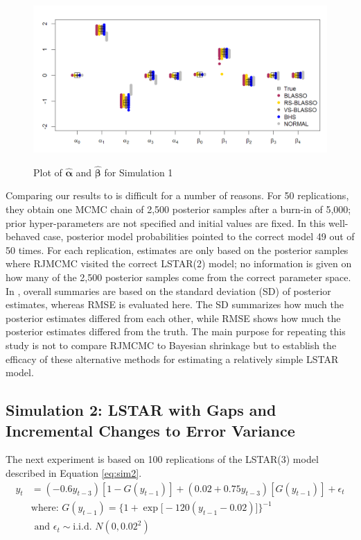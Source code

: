 \begin{figure}[!h]
	\centering
	      \caption{Plot of $\hat{\bm{\alpha}}$ and $\hat{\bm{\beta}}$ for Simulation 1 }
      \includegraphics[scale=0.35]{blassovsbhs}
      \label{fig:blvsbh}
\end{figure}

Comparing our results to \cite{Lopes2006} is difficult for a number of reasons. For 50 replications, they obtain one MCMC chain of 2,500 posterior samples after a burn-in of 5,000; prior hyper-parameters are not specified and initial values are fixed. In this well-behaved case, posterior model probabilities pointed to the correct model 49 out of 50 times. For each replication, estimates are only based on the posterior samples where RJMCMC visited the correct LSTAR(2) model; no information is given on how many of the 2,500 posterior samples come from the correct parameter space. In \cite{Lopes2006}, overall summaries are based on the standard deviation (SD) of posterior estimates, whereas RMSE is evaluated here. The SD summarizes how much the posterior estimates differed from each other, while RMSE shows how much the posterior estimates differed from the truth. The main purpose for repeating this study is not to compare RJMCMC to Bayesian shrinkage but to establish the efficacy of these alternative methods for estimating a relatively simple LSTAR model. 

\subsection{Simulation 2: LSTAR with Gaps and Incremental Changes to Error Variance}
The next experiment is based on 100 replications of the LSTAR(3) model described in Equation \ref{eq:sim2}.
 \begin{equation}
	\begin{split}
		\label{eq:sim2}
		y_t&=(-0.6y_{t-3})[1-G(y_{t-1})] +(0.02+0.75y_{t-3})[G(y_{t-1})]+\epsilon_t\\
		& \textrm{where: } G(y_{t-1})=\bigg\{1+\exp\big[-120(y_{t-1}-0.02)\big]\bigg\}^{-1} \\
		&\textrm{ and }\epsilon_t \sim \textrm{i.i.d. }  N (0,0.02^2)\\
	\end{split}
\end{equation}

